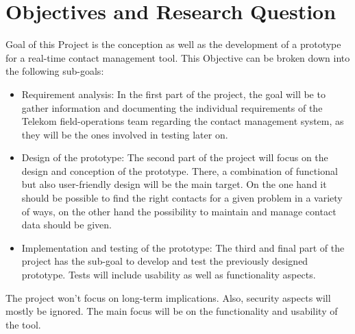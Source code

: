 \newpage
\section{Objectives and Research Question} 
Goal of this Project is the conception as well as the development of a prototype for a real-time 
contact management tool. This Objective can be broken down into the following sub-goals:
\begin{itemize}
    \item Requirement analysis: In the first part of the project, the goal will be to gather 
    information and documenting the individual requirements of the Telekom field-operations 
    team regarding the contact management system, as they will be the ones involved in testing later on.  
    \item Design of the prototype: The second part of the project will focus on the design and 
    conception of the prototype. There, a combination of functional but also user-friendly design 
    will be the main target. On the one hand it should be possible to find the right contacts for a given
    problem in a variety of ways, on the other hand the possibility to maintain and manage contact data 
    should be given.
    \item Implementation and testing of the prototype: The third and final part of the project has
    the sub-goal to develop and test the previously designed prototype. Tests will include usability
    as well as functionality aspects.
\end{itemize}
The project won't focus on long-term implications. Also, security aspects will mostly be ignored. 
The main focus will be on the functionality and usability of the tool.
\\